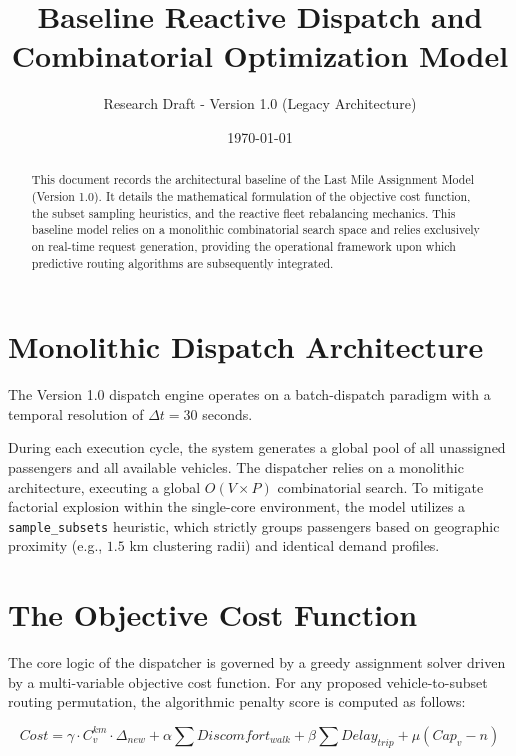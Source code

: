 \documentclass[12pt,a4paper]{article}
\title{\textbf{Baseline Reactive Dispatch and Combinatorial Optimization Model}}
\author{Research Draft - Version 1.0 (Legacy Architecture)}
\date{\today}
\begin{document}
\maketitle

\begin{abstract}
This document records the architectural baseline of the Last Mile Assignment Model (Version 1.0). It details the mathematical formulation of the objective cost function, the subset sampling heuristics, and the reactive fleet rebalancing mechanics. This baseline model relies on a monolithic combinatorial search space and relies exclusively on real-time request generation, providing the operational framework upon which predictive routing algorithms are subsequently integrated.
\end{abstract}

\section{Monolithic Dispatch Architecture}
The Version 1.0 dispatch engine operates on a batch-dispatch paradigm with a temporal resolution of $\Delta t = 30$ seconds. 

During each execution cycle, the system generates a global pool of all unassigned passengers and all available vehicles. The dispatcher relies on a monolithic architecture, executing a global $O(V \times P)$ combinatorial search. To mitigate factorial explosion within the single-core environment, the model utilizes a \texttt{sample\_subsets} heuristic, which strictly groups passengers based on geographic proximity (e.g., $1.5$ km clustering radii) and identical demand profiles.

\section{The Objective Cost Function}
The core logic of the dispatcher is governed by a greedy assignment solver driven by a multi-variable objective cost function. For any proposed vehicle-to-subset routing permutation, the algorithmic penalty score is computed as follows:

\begin{equation}
    Cost = \gamma \cdot C^{km}_v \cdot \Delta_{new} + \alpha \sum Discomfort_{walk} + \beta \sum Delay_{trip} + \mu(Cap_v - n)
\end{equation}
\end{document}
